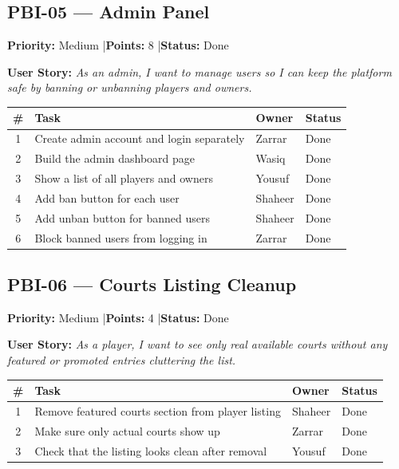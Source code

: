 \documentclass[12pt,a4paper]{article}
\begin{document}
\vspace{1.5em}

\subsection*{PBI-05 --- Admin Panel}
\textbf{Priority:} Medium \quad|\quad \textbf{Points:} 8 \quad|\quad \textbf{Status:} Done

\vspace{0.3em}
\textbf{User Story:} \textit{As an admin, I want to manage users so I can keep the platform safe by banning or unbanning players and owners.}

\vspace{0.5em}
\noindent\renewcommand{\arraystretch}{1.3}
\begin{tabularx}{\textwidth}{|c|X|l|l|}
\hline
\rowcolor{headerbg}\color{white}\bfseries \# & \color{white}\bfseries Task & \color{white}\bfseries Owner & \color{white}\bfseries Status \\ \hline
1 & Create admin account and login separately & Zarrar & Done \\ \hline
\rowcolor{rowgray} 2 & Build the admin dashboard page & Wasiq & Done \\ \hline
3 & Show a list of all players and owners & Yousuf & Done \\ \hline
\rowcolor{rowgray} 4 & Add ban button for each user & Shaheer & Done \\ \hline
5 & Add unban button for banned users & Shaheer & Done \\ \hline
\rowcolor{rowgray} 6 & Block banned users from logging in & Zarrar & Done \\ \hline
\end{tabularx}

\vspace{1.5em}

\subsection*{PBI-06 --- Courts Listing Cleanup}
\textbf{Priority:} Medium \quad|\quad \textbf{Points:} 4 \quad|\quad \textbf{Status:} Done

\vspace{0.3em}
\textbf{User Story:} \textit{As a player, I want to see only real available courts without any featured or promoted entries cluttering the list.}

\vspace{0.5em}
\noindent\renewcommand{\arraystretch}{1.3}
\begin{tabularx}{\textwidth}{|c|X|l|l|}
\hline
\rowcolor{headerbg}\color{white}\bfseries \# & \color{white}\bfseries Task & \color{white}\bfseries Owner & \color{white}\bfseries Status \\ \hline
1 & Remove featured courts section from player listing & Shaheer & Done \\ \hline
\rowcolor{rowgray} 2 & Make sure only actual courts show up & Zarrar & Done \\ \hline
3 & Check that the listing looks clean after removal & Yousuf & Done \\ \hline
\end{tabularx}
\end{document}
